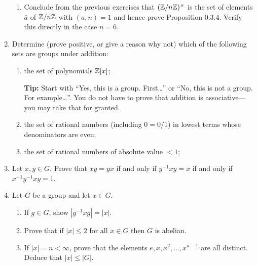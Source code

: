 \documentclass[11pt, reqno]{amsart}
\theoremstyle{plain}
\theoremstyle{definition}
\theoremstyle{example}
\newenvironment{ans}{\color{black}\medskip \paragraph*{\emph{Answer}.}}{\hfill \break  $~\!\!$ \dotfill \medskip }
\newcommand{\NOTE}[1]{{\color{blue}#1}}
\begin{document}
\begin{enumerate}[1.]
\begin{enumerate}
\item Conclude from the previous  exercises that $(\mathbb{Z}/n\mathbb{Z})^\times$ is the set of elements $\bar{a}$ of $\mathbb{Z}/n\mathbb{Z}$ with $(a,n) = 1$ and hence prove Proposition 0.3.4. Verify this directly in the case $n = 6$. 


%
\end{enumerate}



\item	Determine (prove positive, or give a reason why not) which of the following sets are groups under addition:
\begin{enumerate}
\item the set of polynomials $\mathbb{Z}[x]$;
	
\NOTE{\textbf{Tip:} Start with ``Yes, this is a group. First\dots'' or ``No, this is not a group. For example\dots''. You do not have to prove that addition is associative---you may take that for granted.}
% 
	
\item the set of rational numbers (including $0=0/1$) in lowest terms whose denominators are even;
	
%

\item the set of rational numbers of absolute value $< 1$;
	
%
\end{enumerate}

\item Let $x, y \in G$. Prove that $xy=yx$ if and only if $y^{-1}xy = x$ if and only if $x^{-1}y^{-1}xy=1$.



%

\item Let $G$ be a group and let $x \in G$.
\begin{enumerate}
\item If $g \in G$, show $|g^{-1}xg| = |x|$. 
\item Prove that if $|x| \leq 2$ for all $x \in G$ then $G$ is abelian.
\item If $|x| = n < \infty$, prove that the elements $e, x, x^2, \dots, x^{n-1}$ are all distinct. Deduce that $|x| \leq |G|$. 
\end{enumerate}





\end{enumerate}
\end{document}
